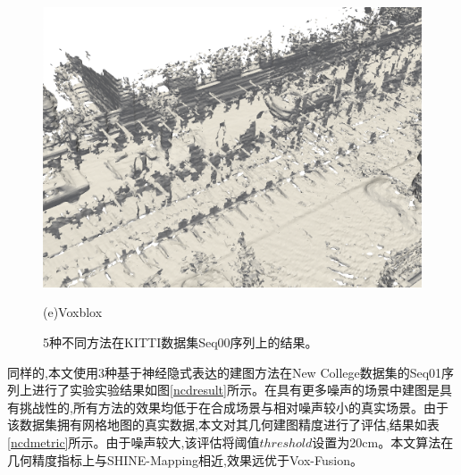 \begin{figure}[htbp]
\begin{minipage}{0.5\linewidth}
    \includegraphics[width=1\linewidth]{figures/kitti_3_voxblox.png}
    \end{minipage}\caption*{(e)Voxblox}
    \caption{5种不同方法在KITTI数据集Seq00序列上的结果。}\label{kittiresult}
\end{figure}
同样的,本文使用3种基于神经隐式表达的建图方法在New College数据集的Seq01序列上进行了实验实验结果如图\ref{ncdresult}所示。在具有更多噪声的场景中建图是具有挑战性的,所有方法的效果均低于在合成场景与相对噪声较小的真实场景。由于该数据集拥有网格地图的真实数据,本文对其几何建图精度进行了评估,结果如表\ref{ncdmetric}所示。由于噪声较大,该评估将阈值$threshold$设置为20cm。本文算法在几何精度指标上与SHINE-Mapping相近,效果远优于Vox-Fusion。
